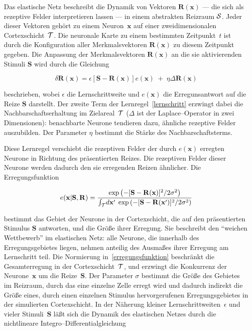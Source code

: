 Das elastische Netz beschreibt die Dynamik von Vektoren $\mathbf{R(x)}$ ---
die sich als rezeptive Felder interpretieren lassen --- in einem abstrakten
Reizraum $\cal S$.  Jeder dieser Vektoren gehört zu einem
Neuron~$\mathbf{x}$ auf einer zweidimensionalen Cortexschicht~$\cal T$.
Die neuronale Karte zu einem bestimmten Zeitpunkt~$t$ ist durch die
Konfiguration aller Merkmalsvektoren $\mathbf{R(x)}$ zu diesem Zeitpunkt
gegeben.  Die Anpassung der Merkmalsvektoren $\mathbf{R(x)}$ an die sie
aktivierenden Stimuli $\mathbf{S}$ wird durch die Gleichung

\begin{equation}
\delta\mathbf{R(x)}=\epsilon\left[\mathbf{S-R(x)}\right]
e(\mathbf{x})\;+\;\eta\Delta \mathbf{R(x)}
\label{lernschritt}
\end{equation}

beschrieben, wobei $\epsilon$ die Lernschrittweite und $e(\mathbf{x})$ die
Erregunsantwort auf die Reize $\mathbf{S}$ darstellt.  Der zweite Term der
Lernregel~\eqref{lernschritt} erzwingt dabei die Nachbarschaftserhaltung im
Zielareal~$\cal T$ ($\Delta$ ist der Laplace--Operator in zwei
Dimensionen): benachbarte Neurone tendieren dazu, ähnliche rezeptive
Felder auszubilden. Der Parameter $\eta$ bestimmt die Stärke des
Nachbarschaftsterms.

Diese Lernregel verschiebt die rezeptiven Felder der durch $e(\mathbf{x})$
erregten Neurone in Richtung des präsentierten Reizes. Die rezeptiven
Felder dieser Neurone werden dadurch den sie erregenden Reizen ähnlicher.
Die Erregungsfunktion

\begin{equation}
e(\mathbf{x|S,R})=\frac{\exp\left(-[\mathbf{S-R(x)}]^2/2\sigma^2\right)}
{\int_{\cal
T}\!d\mathbf{x}^\prime\;\exp\left(-[\mathbf{S-R(\mathbf{x}^\prime)}]^2/2
\sigma^2\right)}
\label{erregungsfunktion}
\end{equation}

\noindent bestimmt das Gebiet der Neurone in der Cortexschicht, die auf den
präsentierten Stimulus $\mathbf{S}$ antworten, und die Größe ihrer
Erregung.  Sie beschreibt den ``weichen Wettbewerb'' im elastischen Netz:
alle Neurone, die innerhalb des Erregungsgebietes liegen, nehmen anteilig
des Ausmaßes ihrer Erregung am Lernschritt teil.  Die Normierung
in~\eqref{erregungsfunktion} beschränkt die Gesamterregung in der
Cortexschicht~$\cal T$, und erzwingt die Konkurrenz der
Neurone~$\mathbf{x}$ um die Reize~$\mathbf{S}$.  Der Parameter $\sigma$
bestimmt die Größe des Gebietes im Reizraum, durch das eine einzelne
Zelle erregt wird und dadurch indirekt die Größe eines, durch einen
einzelnen Stimulus hervorgerufenen Erregungsgebietes in der simulierten
Cortexschicht.  In der Näherung kleiner Lernschrittweiten~$\epsilon$ und
vieler Stimuli~$\mathbf{S}$ läßt sich die Dynamik des elastischen Netzes
durch die nichtlineare Integro--Differentialgleichung

